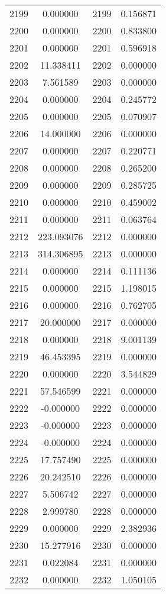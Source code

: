 \documentclass[12pt]{article}
\begin{document}
\begin{longtable}{@{}cccc@{}}
2199 & 0.000000 & 2199 & 0.156871 \\
2200 & 0.000000 & 2200 & 0.833800 \\
2201 & 0.000000 & 2201 & 0.596918 \\
2202 & 11.338411 & 2202 & 0.000000 \\
2203 & 7.561589 & 2203 & 0.000000 \\
2204 & 0.000000 & 2204 & 0.245772 \\
2205 & 0.000000 & 2205 & 0.070907 \\
2206 & 14.000000 & 2206 & 0.000000 \\
2207 & 0.000000 & 2207 & 0.220771 \\
2208 & 0.000000 & 2208 & 0.265200 \\
2209 & 0.000000 & 2209 & 0.285725 \\
2210 & 0.000000 & 2210 & 0.459002 \\
2211 & 0.000000 & 2211 & 0.063764 \\
2212 & 223.093076 & 2212 & 0.000000 \\
2213 & 314.306895 & 2213 & 0.000000 \\
2214 & 0.000000 & 2214 & 0.111136 \\
2215 & 0.000000 & 2215 & 1.198015 \\
2216 & 0.000000 & 2216 & 0.762705 \\
2217 & 20.000000 & 2217 & 0.000000 \\
2218 & 0.000000 & 2218 & 9.001139 \\
2219 & 46.453395 & 2219 & 0.000000 \\
2220 & 0.000000 & 2220 & 3.544829 \\
2221 & 57.546599 & 2221 & 0.000000 \\
2222 & -0.000000 & 2222 & 0.000000 \\
2223 & -0.000000 & 2223 & 0.000000 \\
2224 & -0.000000 & 2224 & 0.000000 \\
2225 & 17.757490 & 2225 & 0.000000 \\
2226 & 20.242510 & 2226 & 0.000000 \\
2227 & 5.506742 & 2227 & 0.000000 \\
2228 & 2.999780 & 2228 & 0.000000 \\
2229 & 0.000000 & 2229 & 2.382936 \\
2230 & 15.277916 & 2230 & 0.000000 \\
2231 & 0.022084 & 2231 & 0.000000 \\
2232 & 0.000000 & 2232 & 1.050105 \\

\end{longtable}
\end{document}
